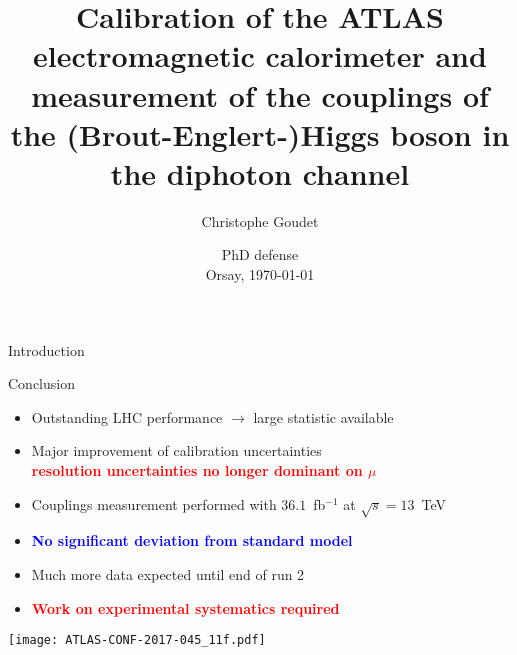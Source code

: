 \documentclass[a4paper]{beamer}
\title[Energy calibration \& Higgs couplings]{Calibration of the ATLAS electromagnetic calorimeter and measurement of the couplings of the (Brout-Englert-)Higgs boson in the diphoton channel}
\author[Goudet]{Christophe Goudet}
\institute[LAL]{\texttt{[image: LAL.jpg]} }
\date[Orsay, \today]{PhD defense \\ Orsay, \today}
\begin{document}
\transboxin
\begin{frame}
\maketitle
\end{frame}

\begin{frame}{Introduction}
\tableofcontents
\end{frame}





\begin{frame}{Conclusion}

  \begin{itemize}
  \item Outstanding LHC performance $\rightarrow$ large statistic available
  \item Major improvement of calibration uncertainties \\
    \textcolor{red}{\bf resolution uncertainties no longer dominant on $\mu$}
  \item Couplings measurement performed with $36.1$~fb$^{-1}$ at $\sqrt{s}=13$~TeV
  \item \textcolor{blue}{\bf No significant deviation from standard model}
    \end{itemize}

  \begin{minipage}{0.39\linewidth}
    \begin{itemize}
    \item Much more data expected until end of run 2
    \item \textcolor{red}{\bf Work on experimental systematics required}
    \end{itemize}
  \end{minipage}
  \begin{minipage}{0.6\linewidth}
    \texttt{[image: ATLAS-CONF-2017-045\_11f.pdf]}
  \end{minipage}
\end{frame}

\begin{frame}
\maketitle
\end{frame}
\appendix



\end{document}
